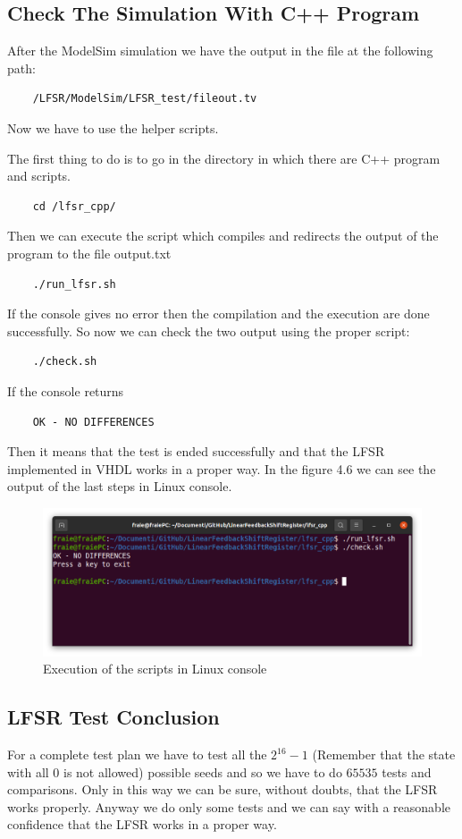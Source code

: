 \documentclass[a4paper]{report}
\begin{document}
\subsection{Check The Simulation With C++ Program}
After the ModelSim simulation we have the output in the file at the following path:
\begin{Verbatim}
	/LFSR/ModelSim/LFSR_test/fileout.tv
\end{Verbatim}
Now we have to use the helper scripts.

\noindent The first thing to do is to go in the directory in which there are C++ program and scripts.
\begin{Verbatim}
	cd /lfsr_cpp/
\end{Verbatim}
Then we can execute the script which compiles and redirects the output of the program to the file output.txt
\begin{Verbatim}
	./run_lfsr.sh
\end{Verbatim}
If the console gives no error then the compilation and the execution are done successfully. So now we can check the two output using the proper script:
\begin{Verbatim}
	./check.sh
\end{Verbatim}
If the console returns
\begin{Verbatim}
	OK - NO DIFFERENCES
\end{Verbatim}
Then it means that the test is ended successfully and that the LFSR implemented in VHDL works in a proper way.
In the figure 4.6 we can see the output of the last steps in Linux console.
\begin{figure}[htpb]
	\centering
	\includegraphics[scale=0.4]{img/tb/linuxConsoleExecution.png}
	\caption{Execution of the scripts in Linux console}
\end{figure}
\newpage
\subsection{LFSR Test Conclusion}
For a complete test plan we have to test all the $2^{16}-1$ (Remember that the state with all 0 is not allowed) possible seeds and so we have to do $65535$ tests and comparisons. Only in this way we can be sure, without doubts, that the LFSR works properly. Anyway we do only some tests and we can say with a reasonable confidence that the LFSR works in a proper way.
\end{document}
